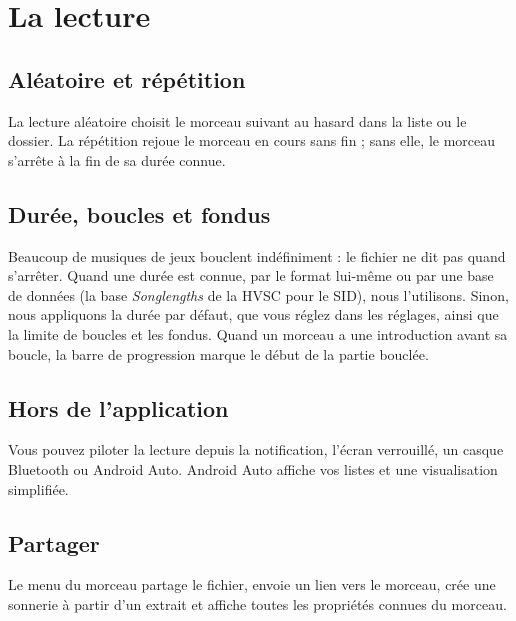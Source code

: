 \chapter{La lecture}

\section{Aléatoire et répétition}
La lecture aléatoire choisit le morceau suivant au hasard dans la liste ou le dossier. La répétition rejoue le
morceau en cours sans fin ; sans elle, le morceau s'arrête à la fin de sa durée connue.

\section{Durée, boucles et fondus}
Beaucoup de musiques de jeux bouclent indéfiniment : le fichier ne dit pas quand s'arrêter. Quand une durée est
connue, par le format lui-même ou par une base de données (la base \emph{Songlengths} de la HVSC pour le SID), nous
l'utilisons. Sinon, nous appliquons la durée par défaut, que vous réglez dans les réglages, ainsi que la limite de
boucles et les fondus. Quand un morceau a une introduction avant sa boucle, la barre de progression marque le début
de la partie bouclée.

\section{Hors de l'application}
Vous pouvez piloter la lecture depuis la notification, l'écran verrouillé, un casque Bluetooth ou Android Auto.
Android Auto affiche vos listes et une visualisation simplifiée.

\section{Partager}
Le menu du morceau partage le fichier, envoie un lien vers le morceau, crée une sonnerie à partir d'un extrait et
affiche toutes les propriétés connues du morceau.
